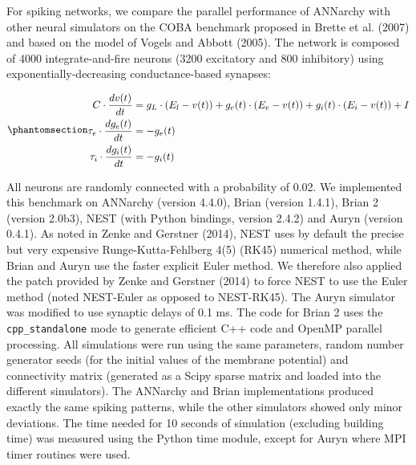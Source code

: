 \documentclass[
  11pt,
  a4paper,
]{scrbook}
\begin{document}
For spiking networks, we compare the parallel performance of ANNarchy
with other neural simulators on the COBA benchmark proposed in Brette et
al. (2007) and based on the model of Vogels and Abbott (2005). The
network is composed of 4000 integrate-and-fire neurons (3200 excitatory
and 800 inhibitory) using exponentially-decreasing conductance-based
synapses:

\begin{equation}\phantomsection\label{eq-fini:coba}{
\begin{aligned}
    C \cdot \frac{d v(t)}{dt} & = g_L \cdot (E_l - v(t)) + g_e(t) \cdot (E_e - v(t)) + g_i(t) \cdot (E_i - v(t)) + I \\
    \tau_e \cdot \frac{d g_e(t)}{dt} & = - g_e(t) \\
    \tau_i \cdot \frac{d g_i(t)}{dt} & = - g_i(t) \\
\end{aligned}
}\end{equation}

All neurons are randomly connected with a probability of 0.02. We
implemented this benchmark on ANNarchy (version 4.4.0), Brian (version
1.4.1), Brian 2 (version 2.0b3), NEST (with Python bindings, version
2.4.2) and Auryn (version 0.4.1). As noted in Zenke and Gerstner (2014),
NEST uses by default the precise but very expensive Runge-Kutta-Fehlberg
4(5) (RK45) numerical method, while Brian and Auryn use the faster
explicit Euler method. We therefore also applied the patch provided by
Zenke and Gerstner (2014) to force NEST to use the Euler method (noted
NEST-Euler as opposed to NEST-RK45). The Auryn simulator was modified to
use synaptic delays of 0.1 ms. The code for Brian 2 uses the
\texttt{cpp\_standalone} mode to generate efficient C++ code and OpenMP
parallel processing. All simulations were run using the same parameters,
random number generator seeds (for the initial values of the membrane
potential) and connectivity matrix (generated as a Scipy sparse matrix
and loaded into the different simulators). The ANNarchy and Brian
implementations produced exactly the same spiking patterns, while the
other simulators showed only minor deviations. The time needed for 10
seconds of simulation (excluding building time) was measured using the
Python time module, except for Auryn where MPI timer routines were used.
\end{document}

